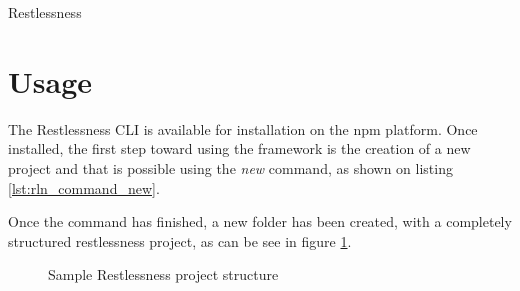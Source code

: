 \begin{chapter}{Restlessness}
    \section{Usage}
    \label{sec:rln_project_usage}

    The Restlessness CLI is available for installation on the npm platform. Once
    installed, the first step toward using the framework is the creation of a new
    project and that is possible using the \textit{new} command, as shown
    on listing \ref{lst:rln_command_new}.

    \bigskip

    Once the command has finished, a new folder has been created, with a completely
    structured restlessness project, as can be see in figure
    \ref{fig:sample_rln_project_folder}.

    \begin{figure}
        \begin{minipage}{\linewidth}
        \end{minipage}
        \caption{Sample Restlessness project structure}
        \label{fig:sample_rln_project_folder}
    \end{figure}


\end{chapter}
